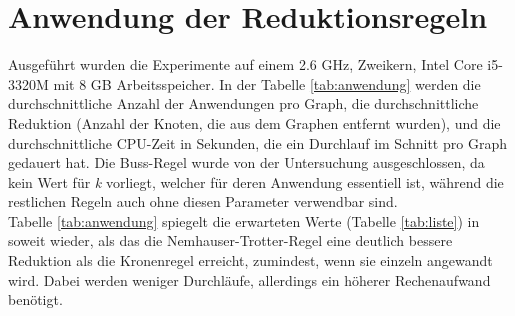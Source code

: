 \section{Anwendung der Reduktionsregeln}
\label{ch:Analyse:sec:Anwendung}

Ausgeführt wurden die Experimente auf einem 2.6 GHz, Zweikern, Intel Core i5-3320M mit 8 GB Arbeitsspeicher. In der Tabelle \ref{tab:anwendung} werden die durchschnittliche Anzahl der Anwendungen pro Graph, die durchschnittliche Reduktion (Anzahl der Knoten, die aus dem Graphen entfernt wurden), und die durchschnittliche CPU-Zeit in Sekunden, die ein Durchlauf im Schnitt pro Graph gedauert hat. Die Buss-Regel wurde von der Untersuchung ausgeschlossen, da kein Wert für \emph{k} vorliegt, welcher für deren Anwendung essentiell ist, während die restlichen Regeln auch ohne diesen Parameter verwendbar sind.\\
Tabelle \ref{tab:anwendung} spiegelt die erwarteten Werte (Tabelle \ref{tab:liste}) in soweit wieder, als das die Nemhauser-Trotter-Regel eine deutlich bessere Reduktion als die Kronenregel erreicht, zumindest, wenn sie einzeln angewandt wird. Dabei werden weniger Durchläufe, allerdings ein höherer Rechenaufwand benötigt.

